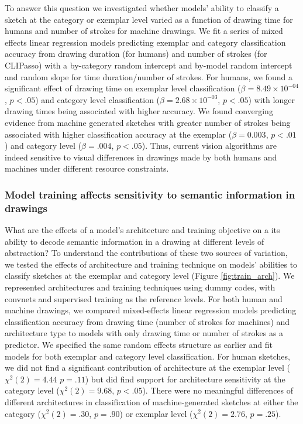 \documentclass[10pt,letterpaper]{article}
\begin{document}
To answer this question we investigated whether models' ability to classify a sketch at the category or exemplar level varied as a function of drawing time for humans and number of strokes for machine drawings. 
We fit a series of mixed effects linear regression models predicting exemplar and category classification accuracy from drawing duration (for humans) and number of strokes (for CLIPasso) with a by-category random intercept and by-model random intercept and random slope for time duration/number of strokes. 
For humans, we found a significant effect of drawing time on exemplar level classification ($\beta = 8.49\times10^{-04}$, $p < .05$) and category level classification ($\beta = 2.68\times10^{-03}$, $p < .05$) with longer drawing times being associated with higher accuracy. 
We found converging evidence from machine generated sketches with greater number of strokes being associated with higher classification accuracy at the exemplar ($\beta = 0.003$, $p < .01$) and category level ($\beta=.004$, $p < .05$).
Thus, current vision algorithms are indeed sensitive to visual differences in drawings made by both humans and machines under different resource constraints.

\subsubsection{Model training affects sensitivity to semantic information in drawings}

What are the effects of a model's architecture and training objective on a its ability to decode semantic information in a drawing at different levels of abstraction? 
To understand the contributions of these two sources of variation, we tested the effects of architecture and training technique on models' abilities to classify sketches at the exemplar and category level (Figure \ref{fig:train_arch}).
We represented architectures and training techniques using dummy codes, with convnets and supervised training as the reference levels.
For both human and machine drawings, we compared mixed-effects linear regression models predicting classification accuracy from drawing time (number of strokes for machines) and architecture type to models with only drawing time or number of strokes as a predictor. 
We specified the same random effects structure as earlier and fit models for both exemplar and category level classification.
For human sketches, we did not find a significant contribution of architecture at the exemplar level ($\chi^2(2) = 4.44$ $p = .11$) but did find support for architecture sensitivity at the category level ($\chi^2(2) = 9.68$, $p < .05$).
There were no meaningful differences of different architectures in classification of machine-generated sketches at either the category ($\chi^2(2) = .30$, $p=.90$) or exemplar level ($\chi^2(2) = 2.76$, $p=.25$).
\end{document}
